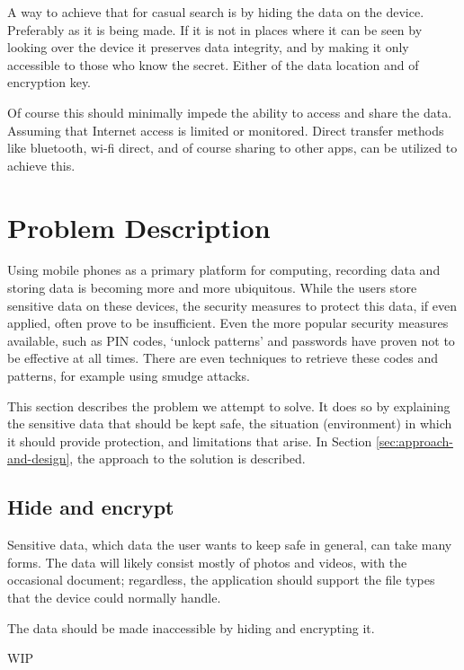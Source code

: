 A way to achieve that for casual search is by hiding the data on the device.
Preferably as it is being made. If it is not in places where it can be seen
by looking over the device it preserves data integrity, and by making it
only accessible to those who know the secret. Either of the data location
and of encryption key.

Of course this should minimally impede the ability to access and share the
data. Assuming that Internet access is limited or monitored. Direct transfer
methods like bluetooth, wi-fi direct, and of course sharing to other apps,
can be utilized to achieve this.

\section{Problem Description}
\label{sec:problem-description}
Using mobile phones as a primary platform for computing, recording data and storing data is becoming more and more ubiquitous.
While the users store sensitive data on these devices, the security measures to protect this data, if even applied, often prove to be insufficient.
Even the more popular security measures available, such as PIN codes, `unlock patterns' and passwords have proven not to be effective at all times.
There are even techniques to retrieve these codes and patterns, for example using smudge attacks\cite{aviv2010smudge}.

This section describes the problem we attempt to solve.
It does so by explaining the sensitive data that should be kept safe, the situation (environment) in which it should provide protection, and limitations that arise.
In Section \ref{sec:approach-and-design}, the approach to the solution is described. 

\subsection{Hide and encrypt}
Sensitive data, which data the user wants to keep safe in general, can take many forms.
The data will likely consist mostly of photos and videos, with the occasional document; regardless, the application should support the file types that the device could normally handle.

The data should be made inaccessible by hiding and encrypting it.

WIP
